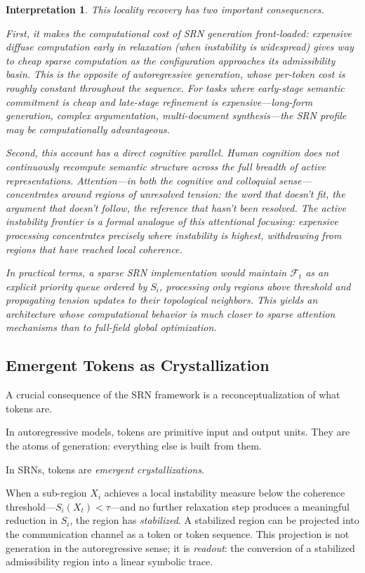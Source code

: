 \documentclass[11pt, a4paper]{article}
\theoremstyle{srn}
\theoremstyle{srnremark}
\newtheorem{interpretation}{Interpretation}[section]
\begin{document}
\begin{interpretation}
This locality recovery has two important consequences.

First, it makes the computational cost of SRN generation
\emph{front-loaded}: expensive diffuse computation early in relaxation
(when instability is widespread) gives way to cheap sparse computation
as the configuration approaches its admissibility basin.
This is the opposite of autoregressive generation, whose per-token
cost is roughly constant throughout the sequence.
For tasks where early-stage semantic commitment is cheap and late-stage
refinement is expensive---long-form generation, complex argumentation,
multi-document synthesis---the SRN profile may be computationally
advantageous.

Second, this account has a direct cognitive parallel.
Human cognition does not continuously recompute semantic structure
across the full breadth of active representations.
Attention---in both the cognitive and colloquial sense---concentrates
around regions of unresolved tension: the word that doesn't fit, the
argument that doesn't follow, the reference that hasn't been resolved.
The active instability frontier is a formal analogue of this
attentional focusing: expensive processing concentrates precisely where
instability is highest, withdrawing from regions that have reached
local coherence.

In practical terms, a sparse SRN implementation would maintain
$\mathcal{F}_t$ as an explicit priority queue ordered by $S_i$,
processing only regions above threshold and propagating tension updates
to their topological neighbors.
This yields an architecture whose computational behavior is much closer
to sparse attention mechanisms than to full-field global optimization.
\end{interpretation}

\subsection{Emergent Tokens as Crystallization}

A crucial consequence of the SRN framework is a reconceptualization of
what tokens are.

In autoregressive models, tokens are primitive input and output units.
They are the atoms of generation: everything else is built from them.

In SRNs, tokens are \emph{emergent crystallizations}.

When a sub-region $X_i$ achieves a local instability measure below the
coherence threshold---$S_i(X_t) < \tau$---and no further relaxation
step produces a meaningful reduction in $S_i$, the region has
\emph{stabilized}.
A stabilized region can be projected into the communication channel as
a token or token sequence.
This projection is not generation in the autoregressive sense; it is
\emph{readout}: the conversion of a stabilized admissibility region
into a linear symbolic trace.
\end{document}
